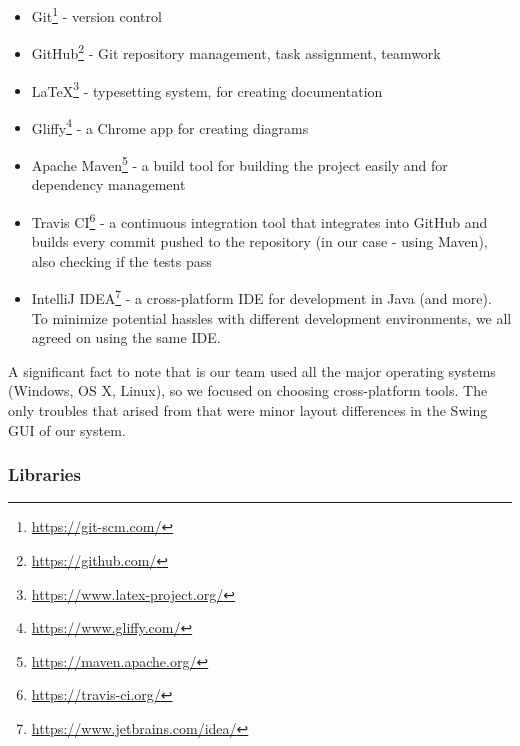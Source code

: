 \documentclass[a4paper,12pt]{article}
\begin{document}
\begin{itemize}
	\item Git\footnote{\url{https://git-scm.com/}} - version control
	\item GitHub\footnote{\url{https://github.com/}} - Git repository management, task assignment, teamwork
	\item \LaTeX\footnote{\url{https://www.latex-project.org/}} - typesetting system, for creating documentation
	\item Gliffy\footnote{\url{https://www.gliffy.com/}} - a Chrome app for creating diagrams
	\item Apache Maven\footnote{\url{https://maven.apache.org/}} - a build tool for building the project easily and for dependency management
	\item Travis CI\footnote{\url{https://travis-ci.org/}} - a continuous integration tool that integrates into GitHub and builds every commit pushed to the repository (in our case - using Maven), also checking if the tests pass
	\item IntelliJ IDEA\footnote{\url{https://www.jetbrains.com/idea/}} - a cross-platform IDE for development in Java (and more). To minimize potential hassles with different development environments, we all agreed on using the same IDE.
\end{itemize}


A significant fact to note that is our team used all the major operating systems (Windows, OS X, Linux), so we focused on choosing cross-platform tools. The only troubles that arised from that were minor layout differences in the Swing GUI of our system.

\subsubsection*{Libraries}
\end{document}
